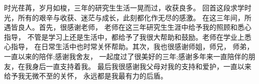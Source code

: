 \begin{acknowledgements}
时光荏苒，岁月如梭，三年的研究生生活一晃而过，收获良多。
回首这段求学时光，所有的艰辛与收获、迷茫与成长，此刻都化作无尽的感激。
在这三年间，所遇皆良人。首先，很感谢老师，
老师在这三年研究生生涯中给予我的照顾和悉心指导，
不管是学习上还是生活中，都给予了我很大帮助和鼓励。老师在学业上悉心指导，
在日常生活中也时常关怀帮助。其次，我也很感谢师姐，师兄，
师弟，一直以来的陪伴;感谢我舍友，
一起度过了很美好的三年;感谢多年来一直陪伴的朋友，在我身后一直支持着我。
最后我很感谢我父母对我的支持和爱护，一直以来给予我无微不至的关怀，
永远都是我最有力的后盾。
\end{acknowledgements}

